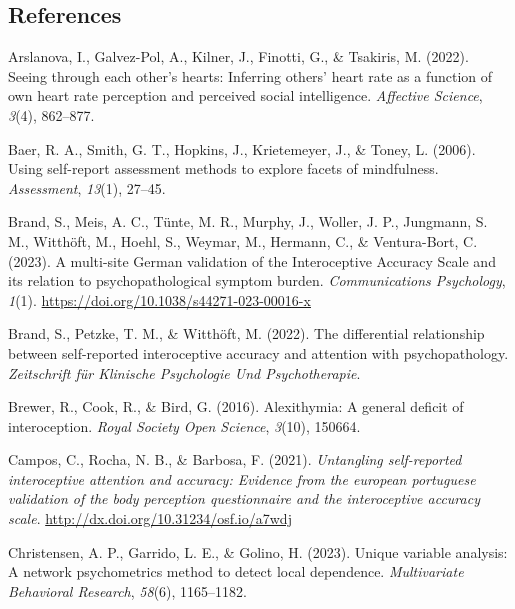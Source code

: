 \documentclass[
  man,
  floatsintext,
  longtable,
  nolmodern,
  notxfonts,
  notimes,
  colorlinks=true,linkcolor=blue,citecolor=blue,urlcolor=blue]{apa7}
\newlength{\cslhangindent}
\newenvironment{CSLReferences}[2] %
 {\begin{list}{}{%
  \setlength{\itemindent}{0pt}
  \setlength{\leftmargin}{0pt}
  \setlength{\parsep}{0pt}
  \ifodd #1
   \setlength{\leftmargin}{\cslhangindent}
   \setlength{\itemindent}{-1\cslhangindent}
  \fi
  \setlength{\itemsep}{#2\baselineskip}}}
 {\end{list}}
\begin{document}
\subsection{References}\label{references}

\label{refs}
\begin{CSLReferences}{1}{0}
Arslanova, I., Galvez-Pol, A., Kilner, J., Finotti, G., \& Tsakiris, M.
(2022). Seeing through each other's hearts: Inferring others' heart rate
as a function of own heart rate perception and perceived social
intelligence. \emph{Affective Science}, \emph{3}(4), 862--877.

Baer, R. A., Smith, G. T., Hopkins, J., Krietemeyer, J., \& Toney, L.
(2006). Using self-report assessment methods to explore facets of
mindfulness. \emph{Assessment}, \emph{13}(1), 27--45.

Brand, S., Meis, A. C., Tünte, M. R., Murphy, J., Woller, J. P.,
Jungmann, S. M., Witthöft, M., Hoehl, S., Weymar, M., Hermann, C., \&
Ventura-Bort, C. (2023). A multi-site German validation of the
Interoceptive Accuracy Scale and its relation to psychopathological
symptom burden. \emph{Communications Psychology}, \emph{1}(1).
\url{https://doi.org/10.1038/s44271-023-00016-x}

Brand, S., Petzke, T. M., \& Witthöft, M. (2022). The differential
relationship between self-reported interoceptive accuracy and attention
with psychopathology. \emph{Zeitschrift f{ü}r Klinische Psychologie Und
Psychotherapie}.

Brewer, R., Cook, R., \& Bird, G. (2016). Alexithymia: A general deficit
of interoception. \emph{Royal Society Open Science}, \emph{3}(10),
150664.

Campos, C., Rocha, N. B., \& Barbosa, F. (2021). \emph{Untangling
self-reported interoceptive attention and accuracy: Evidence from the
european portuguese validation of the body perception questionnaire and
the interoceptive accuracy scale}.
\url{http://dx.doi.org/10.31234/osf.io/a7wdj}

Christensen, A. P., Garrido, L. E., \& Golino, H. (2023). Unique
variable analysis: A network psychometrics method to detect local
dependence. \emph{Multivariate Behavioral Research}, \emph{58}(6),
1165--1182.


\end{CSLReferences}
\end{document}
